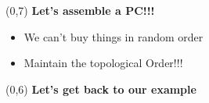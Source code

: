 \color{black}


\begin{frame}
    \transfade
    
   
\end{frame}
\begin{frame}
    \transfade
    
   
\end{frame}
\begin{frame}
    \transfade
    
   
\end{frame}
\begin{frame}
    \transfade
    
   
\end{frame}



\begin{frame}
    
    \transfade
   
    \begin{textblock}{16}(0,7)
        \centering
        \color{black}
        \Huge \textbf{Let's assemble a PC!!!}
    \end{textblock}
   
    
\end{frame}

\begin{frame}
    \transfade
    
\end{frame}

\begin{frame}
    \transfade
    \begin{itemize}
        \item<1-> We can't buy things in random order
        \item<2-> Maintain the topological Order!!!
        
    \end{itemize}

\end{frame}

\begin{frame}
    \transfade
    \begin{textblock}{16}(0,6)
        \centering
        \color{black}
        \Large \textbf{Let's get back to our example}
    \end{textblock}
    
\end{frame}


